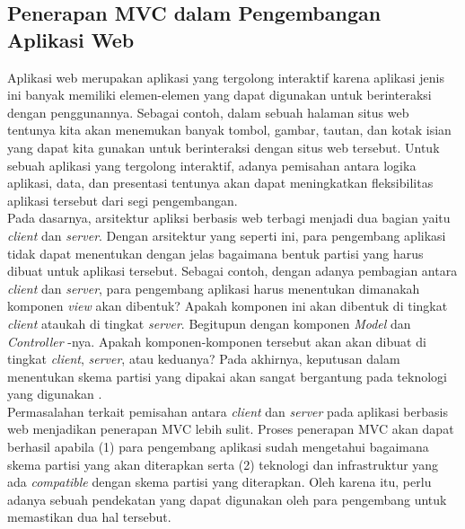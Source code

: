 \subsection{Penerapan MVC dalam Pengembangan Aplikasi Web}
Aplikasi web merupakan aplikasi yang tergolong interaktif karena aplikasi jenis ini banyak memiliki elemen-elemen yang dapat digunakan untuk berinteraksi dengan penggunannya. Sebagai contoh, dalam sebuah halaman situs web tentunya kita akan menemukan banyak tombol, gambar, tautan, dan kotak isian yang dapat kita gunakan untuk berinteraksi dengan situs web tersebut. Untuk sebuah aplikasi yang tergolong interaktif, adanya pemisahan antara logika aplikasi, data, dan presentasi tentunya akan dapat meningkatkan fleksibilitas aplikasi tersebut dari segi pengembangan. \\

\noindent
Pada dasarnya, arsitektur apliksi berbasis web terbagi menjadi dua bagian yaitu \textit{client} dan \textit{server}. Dengan arsitektur yang seperti ini, para pengembang aplikasi tidak dapat menentukan dengan jelas bagaimana bentuk partisi yang harus dibuat untuk aplikasi tersebut. Sebagai contoh, dengan adanya pembagian antara \textit{client} dan \textit{server}, para pengembang aplikasi harus menentukan dimanakah komponen \textit{view} akan dibentuk? Apakah komponen ini akan dibentuk di tingkat \textit{client} ataukah di tingkat \textit{server}. Begitupun dengan komponen \textit{Model} dan \textit{Controller
}-nya. Apakah komponen-komponen tersebut akan akan dibuat di tingkat \textit{client}, \textit{server}, atau keduanya? Pada akhirnya, keputusan dalam menentukan skema partisi yang dipakai akan sangat bergantung pada teknologi yang digunakan \citep{leff2001web}. \\

\noindent
Permasalahan terkait pemisahan antara \textit{client} dan \textit{server} pada aplikasi berbasis web menjadikan penerapan MVC lebih sulit. Proses penerapan MVC akan dapat berhasil apabila (1) para pengembang aplikasi sudah mengetahui bagaimana skema partisi yang akan diterapkan serta (2) teknologi dan infrastruktur yang ada \textit{compatible} dengan skema partisi yang diterapkan. Oleh karena itu, perlu adanya sebuah pendekatan yang dapat digunakan oleh para pengembang untuk memastikan dua hal tersebut.

